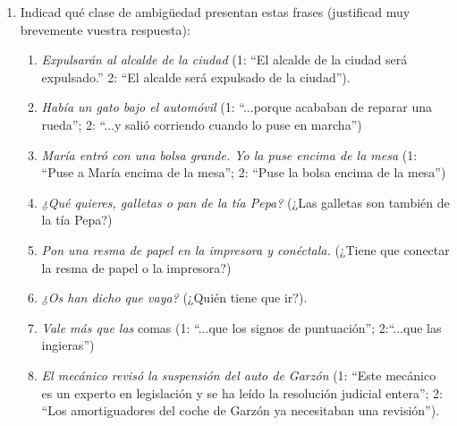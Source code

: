 \begin{enumerate} \item Indicad qué clase de ambigüedad presentan estas frases (justificad muy brevemente vuestra respuesta): \begin{enumerate} \item \emph{Expulsarán al alcalde de la ciudad} (1: ``El alcalde de la ciudad será expulsado.'' 2: ``El alcalde será expulsado de la ciudad''). \item \emph{ Había un gato bajo el automóvil} (1: ``...porque acababan de reparar una rueda''; 2: ``...y salió corriendo cuando lo puse en marcha'') \item \emph{María entró con una bolsa grande. Yo la puse encima de la mesa} (1: ``Puse a María encima de la mesa''; 2: ``Puse la bolsa encima de la mesa'') \item \emph{¿Qué quieres, galletas o pan de la tía Pepa?} (¿Las galletas son también de la tía Pepa?) \item \emph{Pon una resma de papel en la impresora y conéctala.} (¿Tiene que conectar la resma de papel o la impresora?) \item \emph{¿Os han dicho que vaya?} (¿Quién tiene que ir?). \item \emph{Vale más que las} comas (1: ``...que los signos de puntuación''; 2:``...que las ingieras'') \item \emph{El mecánico revisó la suspensión del auto de Garzón} (1: ``Este mecánico es un experto en legislación y se ha leído la resolución judicial entera''; 2: ``Los amortiguadores del coche de Garzón ya necesitaban una revisión''). 


\end{enumerate}
\end{enumerate}
